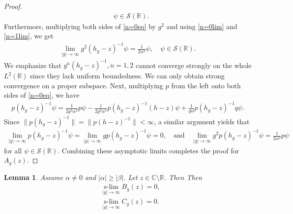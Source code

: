 \documentclass[12pt,dvipdfmx]{article}
\newtheorem{lemma}[theorem]{Lemma}
\newcommand{\RR}{\mathbb{R}}
\newcommand{\CC}{\mathbb{C}}
\begin{document}
\begin{proof}
\begin{align}
    \quad 
    \psi \in {\mathscr S}(\RR).
\end{align}
Furthermore, multiplying both sides of \eqref{n=0eq} by $g^2$ and using \eqref{n=0lim} and \eqref{n=1lim}, we get
\begin{align*}
    \lim_{|g|\to\infty} g^2 (h_g - z)^{-1} \psi = \frac{1}{2\alpha^2} \psi, 
    \quad 
    \psi \in {\mathscr S}(\RR).
\end{align*}
We emphasize that $g^n (h_g - z)^{-1}, n = 1, 2$ cannot converge strongly on the whole $L^2(\RR)$ since they lack uniform boundedness. We can only obtain strong convergence on a proper subspace. Next, multiplying $p$ from the left onto both sides of \eqref{n=0eq}, we have
\begin{align*}
    p (h_g - z)^{-1} \psi
    = \frac{1}{2g^2\alpha^2} p\psi 
    - \frac{1}{2g^2\alpha^2} p (h_g - z)^{-1} (h - z) \psi
    + \frac{1}{g\alpha} p (h_g - z)^{-1} q\psi.
\end{align*}
Since $\| p (h_g - z)^{-1} \| = \| p (h - z)^{-1} \| < \infty$, a similar argument yields that
\begin{align*}
    \lim_{|g|\to\infty} p (h_g - z)^{-1} \psi = \lim_{|g|\to\infty} g p (h_g - z)^{-1} \psi = 0, 
    \quad \text{and} \quad
    \lim_{|g|\to\infty} g^2 p (h_g - z)^{-1} \psi = \frac{1}{2\alpha^2} p\psi
\end{align*}
for all $\psi \in {\mathscr S}(\RR)$. Combining these asymptotic limits completes the proof for $A_g(z)$.
\end{proof}
%
\begin{lemma}\label{lem:offdiag_conv}
Assume $\alpha\ne0$ and $|\alpha|\ge|\beta|$. Let $z\in\CC\setminus\RR$. Then 
Then 
\begin{align*}
&\operatorname*{s-lim}_{|g|\to\infty} B_g(z)=0,\\
&\operatorname*{s-lim}_{|g|\to\infty} C_g(z)=0.
\end{align*}
\end{lemma}
%
\end{document}
